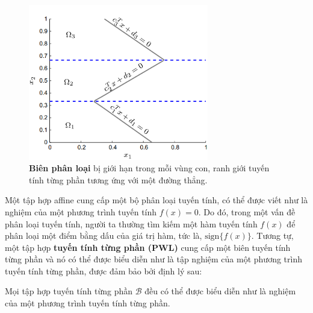\begin{figure}
    \centering
    \includegraphics[width=0.7\textwidth]{images/pwl_boundary.png}
    \caption[Biên phân loại]{\textbf{Biên phân loại} bị giới hạn trong mỗi vùng con, ranh giới tuyến tính từng phần tương ứng với một đường thẳng.}
    \label{fig:pwl_boundary}
\end{figure}

Một tập hợp affine cung cấp một bộ phân loại tuyến tính, có thể được viết như là nghiệm của một phương trình tuyến tính \( f(x) = 0 \). Do đó, trong một vấn đề phân loại tuyến tính, người ta thường tìm kiếm một hàm tuyến tính \( f(x) \) để phân loại một điểm bằng dấu của giá trị hàm, tức là, \( \text{sign}\{f(x)\} \). Tương tự, một tập hợp \textbf{tuyến tính từng phần (PWL)} cung cấp một biên tuyến tính từng phần và nó có thể được biểu diễn như là tập nghiệm của một phương trình tuyến tính từng phần, được đảm bảo bởi định lý sau:

\begin{theorem}
    Mọi tập hợp tuyến tính từng phần \( \mathcal{B} \) đều có thể được biểu diễn như là nghiệm của một phương trình tuyến tính từng phần.
\end{theorem}

